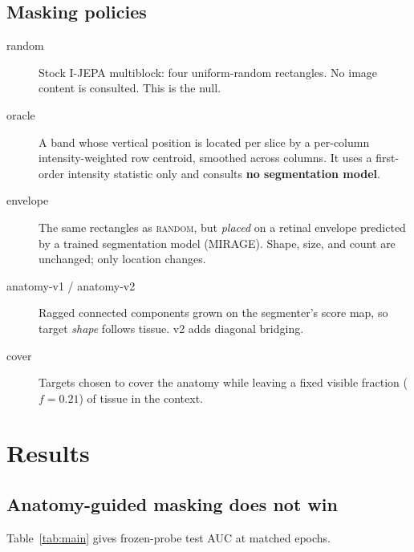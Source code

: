 \documentclass{article}
\begin{document}
\subsection{Masking policies}

\begin{description}
\item[random] Stock I-JEPA multiblock: four uniform-random rectangles. No image
  content is consulted. This is the null.
\item[oracle] A band whose vertical position is located per slice by a
  per-column intensity-weighted row centroid, smoothed across columns. It uses
  a first-order intensity statistic only and consults \textbf{no segmentation
  model}.
\item[envelope] The same rectangles as \textsc{random}, but \emph{placed} on a
  retinal envelope predicted by a trained segmentation model (MIRAGE). Shape,
  size, and count are unchanged; only location changes.
\item[anatomy-v1 / anatomy-v2] Ragged connected components grown on the
  segmenter's score map, so target \emph{shape} follows tissue. v2 adds
  diagonal bridging.
\item[cover] Targets chosen to cover the anatomy while leaving a fixed visible
  fraction ($f{=}0.21$) of tissue in the context.
\end{description}

\section{Results}

\subsection{Anatomy-guided masking does not win}

Table~\ref{tab:main} gives frozen-probe test AUC at matched epochs.
\end{document}
